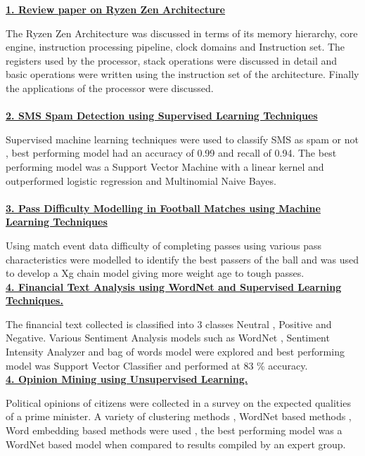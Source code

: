 \href{https://github.com/Dinesh-Adhithya-H/Computer-Organization/blob/main/Review-Paper-Ryzen-Zen/Ryzen_Zen_Review_Paper.pdf}{\bf 1. Review paper on Ryzen Zen Architecture}
\item The Ryzen Zen Architecture was discussed in terms of its memory hierarchy, core engine, instruction processing pipeline, clock domains and Instruction set. The registers used by the processor, stack operations were discussed in detail and basic operations were written using the instruction set of the architecture. Finally the applications of the processor were discussed.
\\
\\
\href{https://drive.google.com/file/d/1kGVBKwxRkC86UBDCQIcwyQ3t-7vw-IBH/view?usp=sharing}{\bf 2. SMS Spam Detection using Supervised Learning Techniques}
\item Supervised machine learning techniques were used  to classify SMS as spam or not , best performing model had an accuracy of 0.99 and recall of 0.94. The best performing model was a Support Vector Machine with a linear kernel and outperformed logistic regression and Multinomial Naive Bayes.
\\
\\
\href{https://drive.google.com/file/d/1OgF5Zdq66psz5MwVXvDwwPBuZL3PSWPV/view?usp=sharing}{{\bf 3. Pass Difficulty Modelling in Football Matches using Machine Learning Techniques}}
\item Using match event data difficulty of completing passes using various pass characteristics were modelled to identify the best passers of the ball and was used to develop a Xg chain model giving more weight age to tough passes.
\\

\href{https://github.com/Dinesh-Adhithya-H/Natural-Language-Processing/blob/main/Financial-Sentiment-Analysis/Report (2).pdf}{{\bf 4. Financial Text Analysis using WordNet and Supervised Learning Techniques.}}
\item The financial text collected is classified into 3 classes Neutral , Positive and Negative. Various Sentiment Analysis models such as WordNet , Sentiment Intensity Analyzer and bag of words model were explored and best performing model was Support Vector Classifier and performed at 83 \% accuracy.\\

\href{https://github.com/Dinesh-Adhithya-H/Natural-Language-Processing/blob/main/Unsupervised-Opinion-Mining/Report.pdf}{{\bf 4. Opinion Mining using Unsupervised Learning.}}
\item Political opinions of citizens were collected in a survey on the expected qualities of a prime minister. A variety of clustering methods , WordNet based methods , Word embedding based methods were used , the best performing model was a WordNet based model when compared to results compiled by an expert group.


